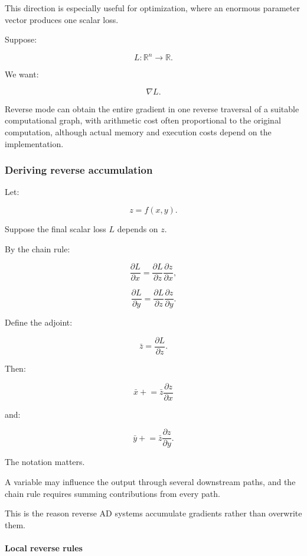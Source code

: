This direction is especially useful for optimization, where an enormous parameter vector produces one scalar loss.

Suppose:

\[
L:\mathbb R^n\rightarrow\mathbb R.
\]

We want:

\[
\nabla L.
\]

Reverse mode can obtain the entire gradient in one reverse traversal of a suitable computational graph, with arithmetic cost often proportional to the original computation, although actual memory and execution costs depend on the implementation.

\subsubsection{Deriving reverse accumulation}\label{02-foundations-ii-ch022-deriving-reverse-accumulation}

\hypertarget{02-foundations-ii-ch022-deriving-reverse-accumulation}{}

Let:

\[
z=f(x,y).
\]

Suppose the final scalar loss \(L\) depends on \(z\).

By the chain rule:

\[
\frac{\partial L}{\partial x} = \frac{\partial L}{\partial z} \frac{\partial z}{\partial x},
\]

\[
\frac{\partial L}{\partial y} = \frac{\partial L}{\partial z} \frac{\partial z}{\partial y}.
\]

Define the adjoint:

\[
\bar z=\frac{\partial L}{\partial z}.
\]

Then:

\[
\boxed{ \bar x\mathrel{+}= \bar z\frac{\partial z}{\partial x} }
\]

and:

\[
\boxed{ \bar y\mathrel{+}= \bar z\frac{\partial z}{\partial y} }.
\]

The \BookInlineCode{+=} notation matters.

A variable may influence the output through several downstream paths, and the chain rule requires summing contributions from every path.

This is the reason reverse AD systems accumulate gradients rather than overwrite them.

\paragraph{Local reverse rules}\label{02-foundations-ii-ch022-local-reverse-rules}

